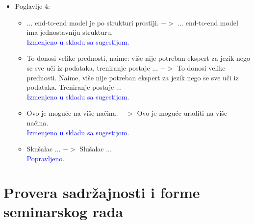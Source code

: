 \documentclass[a4paper]{report}
\newcommand{\odgovor}[1]{\textcolor{blue}{#1}}
\begin{document}
\begin{itemize}
    \item Poglavlje 4:
    \begin{itemize}
        \item ... end-to-end model je po strukturi prostiji. $->$ ... end-to-end model ima jednostavniju strukturu.\\ \odgovor{Izmenjeno u skladu sa sugestijom.}
        \item To donosi velike prednosti, naime: više nije potreban ekspert za jezik nego se sve uči iz podataka, treniranje postaje ... $->$ 
        To donosi velike prednosti. Naime, više nije potreban ekspert za jezik nego se sve uči iz podataka. Treniranje postaje ...\\ \odgovor{Izmenjeno u skladu sa sugestijom.}
        \item Ovo je moguće na više načina. $->$ Ovo je moguće uraditi na više načina.\\ \odgovor{Izmenjeno u skladu sa sugestijom.}
        \item Skušalac ... $->$ Slušalac ...\\ \odgovor{Popravljeno.}
    \end{itemize}
\end{itemize}


\section{Provera sadržajnosti i forme seminarskog rada}
\end{document}
